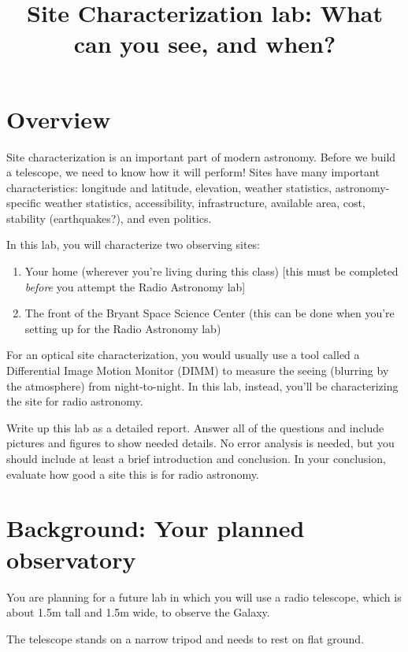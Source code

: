 \documentclass[11pt]{article}
\begin{document}
\title{Site Characterization lab: What can you see, and when?}
\maketitle

\section{Overview}

Site characterization is an important part of modern astronomy.  Before we
build a telescope, we need to know how it will perform!  Sites have many
important characteristics: longitude and latitude, elevation, weather
statistics, astronomy-specific weather statistics, accessibility,
infrastructure, available area, cost, stability (earthquakes?), and even
politics.

In this lab, you will characterize two observing sites:
\begin{enumerate}
\item Your home (wherever you're living during this class)
    [this must be completed \emph{before} you attempt the Radio Astronomy lab]
\item The front of the Bryant Space Science Center
    (this can be done when you're setting up for the Radio Astronomy lab)
\end{enumerate}

For an optical site characterization, you would usually use a tool called a 
Differential Image Motion Monitor (DIMM) to measure the seeing (blurring
by the atmosphere) from night-to-night.  In this lab, instead, you'll
be characterizing the site for radio astronomy.

Write up this lab as a detailed report.  Answer all of the questions
and include pictures and figures to show needed details.
No error analysis is needed, but you should include at least a brief
introduction and conclusion.  In your conclusion, evaluate how good
a site this is for radio astronomy.


\section{Background: Your planned observatory}
You are planning for a future lab in which you will use a radio
telescope, which is about 1.5m tall and 1.5m wide, to observe the Galaxy.

The telescope stands on a narrow tripod and needs to rest on flat ground.
\end{document}
